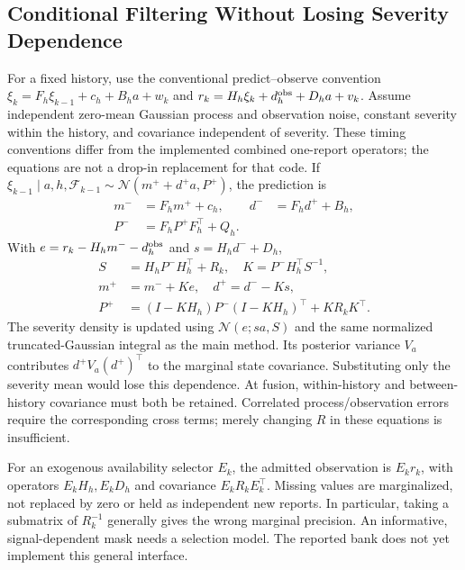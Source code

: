 \subsection{Conditional Filtering Without Losing Severity Dependence}
For a fixed history, use the conventional predict--observe convention
$\xi_k=F_h\xi_{k-1}+c_h+B_ha+w_k$ and
$r_k=H_h\xi_k+d_h^{\rm obs}+D_ha+v_k$.
Assume independent zero-mean Gaussian process and observation noise,
constant severity within the history, and covariance independent of severity.
These timing conventions differ from the implemented combined one-report
operators; the equations are not a drop-in replacement for that code.
If $\xi_{k-1}\mid a,h,\mathcal F_{k-1}\sim
\mathcal N(m^++d^+a,P^+)$, the prediction is
\begin{align}
 m^-&=F_hm^++c_h,& d^-&=F_hd^++B_h,\nonumber\\
 P^-&=F_hP^+F_h^\top+Q_h.\label{eq:adaptive-affine-predict}
\end{align}
With $e=r_k-H_hm^--d_h^{\rm obs}$ and $s=H_hd^-+D_h$,
\begin{align}
 S&=H_hP^-H_h^\top+R_k,\quad K=P^-H_h^\top S^{-1},\nonumber\\
 m^+&=m^-+Ke,\quad d^+=d^--Ks,\nonumber\\
 P^+&=(I-KH_h)P^-(I-KH_h)^\top+KR_kK^\top.
 \label{eq:adaptive-affine-update}
\end{align}
The severity density is updated using $\mathcal N(e;sa,S)$ and the
same normalized truncated-Gaussian integral as the main method.
Its posterior variance $V_a$ contributes $d^+V_a(d^+)^\top$ to the
marginal state covariance. Substituting only the severity mean would lose
this dependence. At fusion, within-history and between-history covariance
must both be retained. Correlated process/observation errors require the
corresponding cross terms; merely changing $R$ in these equations is insufficient.

For an exogenous availability selector $E_k$, the admitted observation is
$E_kr_k$, with operators $E_kH_h,E_kD_h$ and covariance
$E_kR_kE_k^\top$. Missing values are marginalized, not replaced by zero
or held as independent new reports. In particular, taking a submatrix of
$R_k^{-1}$ generally gives the wrong marginal precision. An informative,
signal-dependent mask needs a selection model. The reported bank does not
yet implement this general interface.


